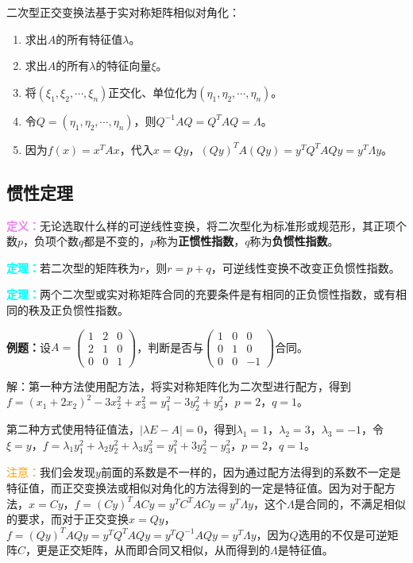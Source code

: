 \documentclass[UTF8, 12pt]{ctexart}
\begin{document}
二次型正交变换法基于实对称矩阵相似对角化：

\begin{enumerate}
\item 求出$A$的所有特征值$\lambda$。
\item 求出$A$的所有$\lambda$的特征向量$\xi$。
\item 将$(\xi_1,\xi_2,\cdots,\xi_n)$正交化、单位化为$(\eta_1,\eta_2,\cdots,\eta_n)$。
\item 令$Q=(\eta_1,\eta_2,\cdots,\eta_n)$，则$Q^{-1}AQ=Q^TAQ=\Lambda$。
\item 因为$f(x)=x^TAx$，代入$x=Qy$，$(Qy)^TA(Qy)=y^TQ^TAQy=y^T\Lambda y$。
\end{enumerate}

\subsection{惯性定理}

\textcolor{violet}{\textbf{定义：}}无论选取什么样的可逆线性变换，将二次型化为标准形或规范形，其正项个数$p$，负项个数$q$都是不变的，$p$称为\textbf{正惯性指数}，$q$称为\textbf{负惯性指数}。

\textcolor{aqua}{\textbf{定理：}}若二次型的矩阵秩为$r$，则$r=p+q$，可逆线性变换不改变正负惯性指数。

\textcolor{aqua}{\textbf{定理：}}两个二次型或实对称矩阵合同的充要条件是有相同的正负惯性指数，或有相同的秩及正负惯性指数。

\textbf{例题：}设$A=\left(\begin{array}{ccc}
1 & 2 & 0 \\
2 & 1 & 0 \\
0 & 0 & 1
\end{array}\right)$，判断是否与$\left(\begin{array}{ccc}
1 & 0 & 0 \\
0 & 1 & 0 \\
0 & 0 & -1
\end{array}\right)$合同。

解：第一种方法使用配方法，将实对称矩阵化为二次型进行配方，得到$f=(x_1+2x_2)^2-3x_2^2+x_3^2=y_1^2-3y_2^2+y_3^2$，$p=2$，$q=1$。

第二种方式使用特征值法，$\vert\lambda E-A\vert=0$，得到$\lambda_1=1$，$\lambda_2=3$，$\lambda_3=-1$，令$\xi=y$，$f=\lambda_1y_1^2+\lambda_2y_2^2+\lambda_3y_3^2=y_1^2+3y_2^2-y_3^2$，$p=2$，$q=1$。

\textcolor{orange}{注意：}我们会发现$y$前面的系数是不一样的，因为通过配方法得到的系数不一定是特征值，而正交变换法或相似对角化的方法得到的一定是特征值。因为对于配方法，$x=Cy$，$f=(Cy)^TACy=y^TC^TACy=y^T\Lambda y$，这个$\Lambda$是合同的，不满足相似的要求，而对于正交变换$x=Qy$，$f=(Qy)^TAQy=y^TQ^TAQy=y^TQ^{-1}AQy=y^T\Lambda y$，因为$Q$选用的不仅是可逆矩阵$C$，更是正交矩阵，从而即合同又相似，从而得到的$\Lambda$是特征值。
\end{document}
